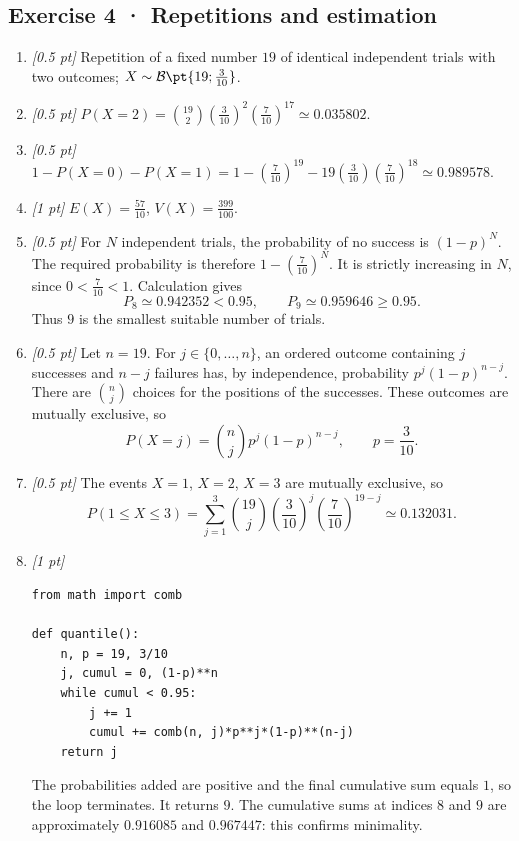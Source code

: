 \subsection*{Exercise 4 · Repetitions and estimation}\begin{enumerate}

\item \textit{[0.5 pt]} Repetition of a fixed number $19$ of identical independent trials with two outcomes; $X\sim\mathcal B\pt{19;\frac{3}{10}}$.

\item \textit{[0.5 pt]} $P(X=2)=\binom{19}2(\frac{3}{10})^2(\frac{7}{10})^{17}\simeq\num{0,035802}$.

\item \textit{[0.5 pt]} $1-P(X=0)-P(X=1)=1-(\frac{7}{10})^{19}-19(\frac{3}{10})(\frac{7}{10})^{18}\simeq\num{0,989578}$.

\item \textit{[1 pt]} $E(X)=\frac{57}{10}$, $V(X)=\frac{399}{100}$.

\item \textit{[0.5 pt]} For $N$ independent trials, the probability of no success is $(1-p)^N$. The required probability is therefore $1-(\frac{7}{10})^N$. It is strictly increasing in $N$, since $0<\frac{7}{10}<1$. Calculation gives
\[P_{8}\simeq\num{0,942352}<\num{0,95},\qquad P_{9}\simeq\num{0,959646}\ge\num{0,95}.\]
Thus $9$ is the smallest suitable number of trials.

\item \textit{[0.5 pt]} Let $n=19$. For $j\in\{0,\ldots,n\}$, an ordered outcome containing $j$ successes and $n-j$ failures has, by independence, probability $p^j(1-p)^{n-j}$. There are $\binom nj$ choices for the positions of the successes. These outcomes are mutually exclusive, so
\[P(X=j)=\binom nj p^j(1-p)^{n-j},\qquad p=\frac{3}{10}.\]

\item \textit{[0.5 pt]} The events $X=1$, $X=2$, $X=3$ are mutually exclusive, so
\[P(1\le X\le3)=\sum_{j=1}^3\binom{19}j(\frac{3}{10})^j(\frac{7}{10})^{19-j}\simeq\num{0,132031}.\]


\item \textit{[1 pt]} 
\begin{lstlisting}
from math import comb

def quantile():
    n, p = 19, 3/10
    j, cumul = 0, (1-p)**n
    while cumul < 0.95:
        j += 1
        cumul += comb(n, j)*p**j*(1-p)**(n-j)
    return j
\end{lstlisting}
The probabilities added are positive and the final cumulative sum equals $1$, so the loop terminates. It returns $9$. The cumulative sums at indices $8$ and $9$ are approximately $\num{0,916085}$ and $\num{0,967447}$: this confirms minimality.

\end{enumerate}

